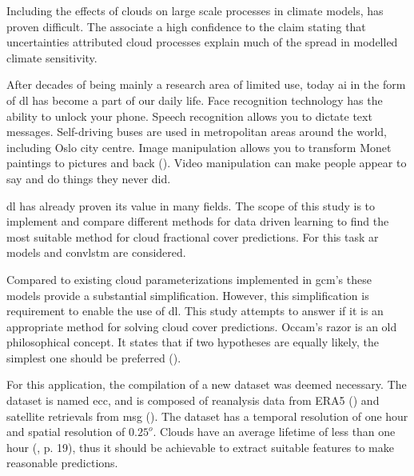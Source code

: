 Including the effects of clouds on large scale processes in climate models, has proven difficult. The  associate a high confidence to the claim stating that uncertainties attributed cloud processes explain much of the spread in modelled climate sensitivity. 

After decades of being mainly a research area of limited use, today \acrfull{ai} in the form of \acrfull{dl} has become a part of our daily life. Face recognition technology has the ability to unlock your phone. Speech recognition allows you to dictate text messages. %
Self-driving buses are used in metropolitan areas around the world, including Oslo city centre.  %
Image manipulation allows you to transform Monet paintings to pictures and back (\cite{zhu2017_cycleGAN_monet_zebra}). Video manipulation can make people appear to say and do things they never did. 

\acrshort{dl} has already proven its value in many fields. The scope of this study is to implement and compare different methods for data driven learning to find the most suitable method for cloud fractional cover predictions. For this task \acrfull{ar} models and \acrfull{convlstm} are considered. 

Compared to existing cloud parameterizations implemented in \acrlong{gcm}'s these models provide a substantial simplification.
However, this simplification is requirement to enable the use of \acrshort{dl}. This study attempts to answer if it is an appropriate method for solving cloud cover predictions.
Occam's razor is an old philosophical concept. It states that if two hypotheses are equally likely, the simplest one should be preferred (\cite{noauthor_occams_nodate}). 

For this application, the compilation of a new dataset was deemed necessary. The dataset is named \acrfull{ecc}, and is composed of reanalysis data from ERA5 (\cite{ERA52020}) and satellite retrievals from \acrfull{msg} (\cite{Schmetz_meteosat_intro}).
The dataset has a temporal resolution of one hour and spatial resolution of $0.25^o$. Clouds have an average lifetime of less than one hour (\cite{lohmann2016}, p. 19), thus it should be achievable to extract suitable features to make reasonable predictions. 

